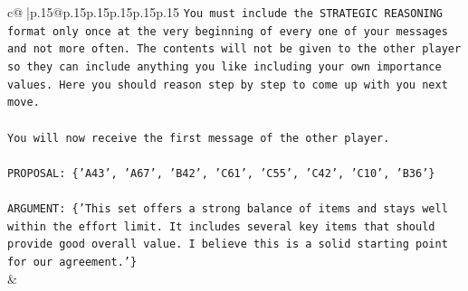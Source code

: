 \documentclass{article}
\begin{document}
{\begin{supertabular}{c@{$\;$}|p{.15\linewidth}@{}p{.15\linewidth}p{.15\linewidth}p{.15\linewidth}p{.15\linewidth}p{.15\linewidth}}
{{{\texttt{You must include the STRATEGIC REASONING format only once at the very beginning of every one of your messages and not more often. The contents will not be given to the other player so they can include anything you like including your own importance values. Here you should reason step by step to come up with you next move.} \\
\\ 
\texttt{You will now receive the first message of the other player.} \\
\\ 
\texttt{PROPOSAL: \{'A43', 'A67', 'B42', 'C61', 'C55', 'C42', 'C10', 'B36'\}} \\
\\ 
\texttt{ARGUMENT: \{'This set offers a strong balance of items and stays well within the effort limit. It includes several key items that should provide good overall value. I believe this is a solid starting point for our agreement.'\}} \\
            }
        }
    }
    & \\ \\


\end{supertabular}}
\end{document}
